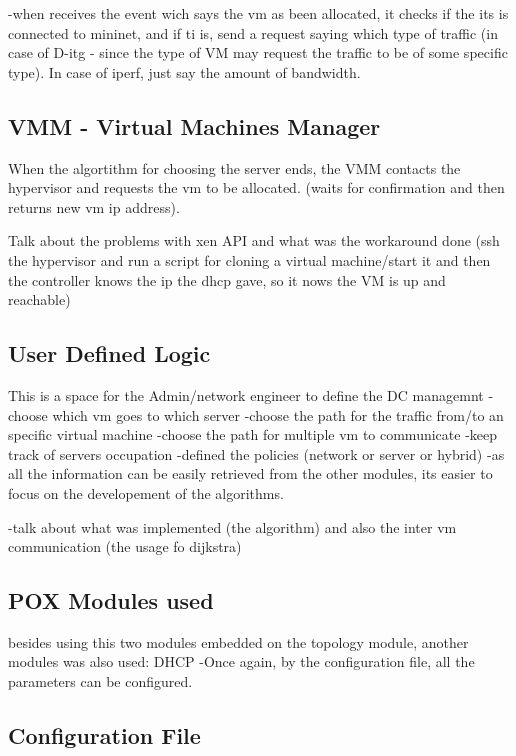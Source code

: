 \documentclass[12pt,english,oneside]{book}
\begin{document}
-when receives the event wich says the vm as been allocated, it checks if the its is connected to mininet, and if ti is, send a request saying which type of traffic (in case of D-itg - since the type of VM may request the traffic to be of some specific type). In case of iperf, just say the amount of bandwidth.

\subsection{VMM - Virtual Machines Manager}
\hspace{0.6cm}

When the algortithm for choosing the server ends, the VMM contacts the hypervisor and requests the vm to be allocated. (waits for confirmation and then returns new vm ip address).

Talk about the problems with xen API and what was the workaround done (ssh the hypervisor and run a script for cloning a virtual machine/start it and then the controller knows the ip the dhcp gave, so it nows the VM is up and reachable)

\subsection{User Defined Logic}
\hspace{0.6cm}
 
This is a space for the Admin/network engineer to define the DC managemnt
-choose which vm goes to which server
-choose the path for the traffic from/to an specific virtual machine
-choose the path for multiple vm to communicate
-keep track of servers occupation
-defined the policies (network or server or hybrid)
-as all the information can be easily retrieved from the other modules, its easier to focus on the developement of the algorithms.

-talk about what was implemented (the algorithm) and also the inter vm communication (the usage fo dijkstra)

\subsection{POX Modules used}
\hspace{0.6cm}

besides using this two modules embedded on the topology module, another modules was also used: DHCP
-Once again, by the configuration file, all the parameters can be configured.

\subsection{Configuration File}
\hspace{0.6cm}
\end{document}
